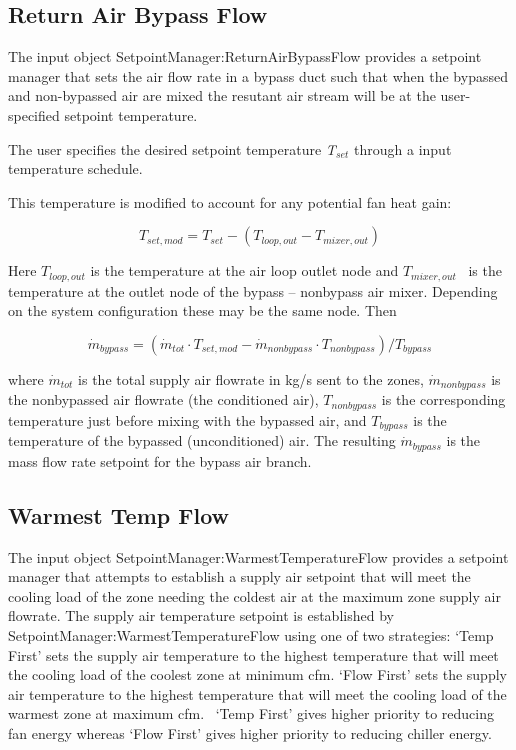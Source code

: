 \subsection{Return Air Bypass Flow}\label{return-air-bypass-flow}

The input object SetpointManager:ReturnAirBypassFlow provides a setpoint manager that sets the air flow rate in a bypass duct such that when the bypassed and non-bypassed air are mixed the resutant air stream will be at the user-specified setpoint temperature.

The user specifies the desired setpoint temperature \emph{T\(_{set}\)} through a input temperature schedule.

This temperature is modified to account for any potential fan heat gain:

\begin{equation}
{T_{set,mod}} = {T_{set}} - ({T_{loop,out}} - {T_{mixer,out}})
\end{equation}

Here \({T_{loop,out}}\) is the temperature at the air loop outlet node and \({T_{mixer,out}}\) ~is the temperature at the outlet node of the bypass -- nonbypass air mixer. Depending on the system configuration these may be the same node. Then

\begin{equation}
{\dot m_{bypass}} = ({\dot m_{tot}}\cdot {T_{set,mod}} - {\dot m_{nonbypass}}\cdot {T_{nonbypass}})/{T_{bypass}}
\end{equation}

where \({\dot m_{tot}}\) is the total supply air flowrate in kg/s sent to the zones, \({\dot m_{nonbypass}}\) is the nonbypassed air flowrate (the conditioned air), \({T_{nonbypass}}\) is the corresponding temperature just before mixing with the bypassed air, and \({T_{bypass}}\) is the temperature of the bypassed (unconditioned) air. The resulting \({\dot m_{bypass}}\) is the mass flow rate setpoint for the bypass air branch.

\subsection{Warmest Temp Flow}\label{warmest-temp-flow}

The input object SetpointManager:WarmestTemperatureFlow provides a setpoint manager that attempts to establish a supply air setpoint that will meet the cooling load of the zone needing the coldest air at the maximum zone supply air flowrate. The supply air temperature setpoint is established by SetpointManager:WarmestTemperatureFlow using one of two strategies: `Temp First' sets the supply air temperature to the highest temperature that will meet the cooling load of the coolest zone at minimum cfm. `Flow First' sets the supply air temperature to the highest temperature that will meet the cooling load of the warmest zone at maximum cfm.~ `Temp First' gives higher priority to reducing fan energy whereas `Flow First' gives higher priority to reducing chiller energy.

